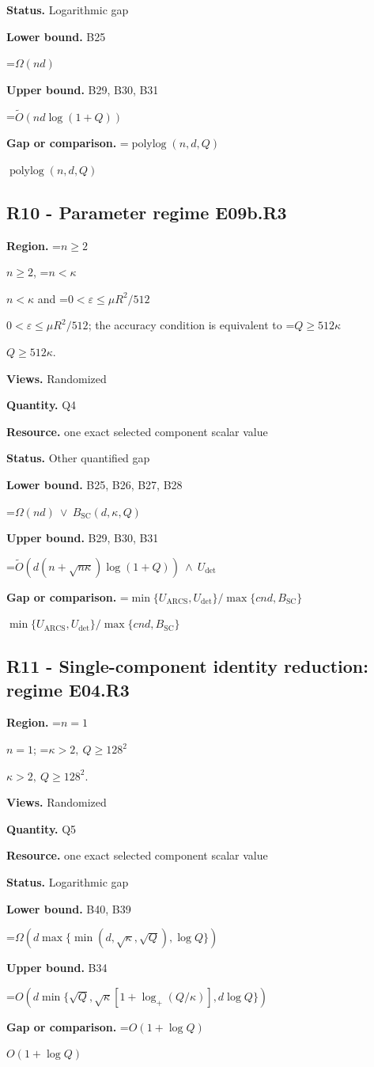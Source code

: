 \documentclass[10pt,a4paper]{article}
\newcommand{\AtlasMath}[1]{\par\begingroup\centering\setbox0=\hbox{$\displaystyle #1$}\ifdim\wd0>1.4\linewidth\typeout{ATLAS WIDE FORMULA: \the\wd0}\fi\ifdim\wd0>\linewidth\resizebox{\linewidth}{!}{\box0}\else\box0\fi\par\endgroup}
\newcommand{\AtlasInlineMath}[1]{\begingroup\setbox0=\hbox{$#1$}\ifdim\wd0>.4\linewidth\endgroup\AtlasMath{#1}\else\endgroup$#1$\fi}
\begin{document}
\textbf{Status.} Logarithmic gap

\textbf{Lower bound.} B25

\AtlasMath{\Omega(nd)}
\textbf{Upper bound.} B29, B30, B31

\AtlasMath{\widetilde{O}(nd\log(1+Q))}
\textbf{Gap or comparison.} \AtlasInlineMath{\operatorname{polylog}(n,d,Q)}

\subsection{R10 - Parameter regime E09b.R3}
\textbf{Region.} \AtlasInlineMath{n\ge2}, \AtlasInlineMath{n<\kappa} and \AtlasInlineMath{0<\varepsilon\le\mu R^2/512}; the accuracy condition is equivalent to \AtlasInlineMath{Q\ge512\kappa}.

\textbf{Views.} Randomized

\textbf{Quantity.} Q4

\textbf{Resource.} one exact selected component scalar value

\textbf{Status.} Other quantified gap

\textbf{Lower bound.} B25, B26, B27, B28

\AtlasMath{\Omega(nd)\ \vee\ B_{\mathrm{SC}}(d,\kappa,Q)}
\textbf{Upper bound.} B29, B30, B31

\AtlasMath{\widetilde{O}(d(n+\sqrt{n\kappa})\log(1+Q))\ \wedge\ U_{\mathrm{det}}}
\textbf{Gap or comparison.} \AtlasInlineMath{\min\{U_{\mathrm{ARCS}},U_{\mathrm{det}}\}/\max\{cnd,B_{\mathrm{SC}}\}}

\subsection{R11 - Single-component identity reduction: regime E04.R3}
\textbf{Region.} \AtlasInlineMath{n=1}; \AtlasInlineMath{\kappa>2,\ Q\ge128^2}.

\textbf{Views.} Randomized

\textbf{Quantity.} Q5

\textbf{Resource.} one exact selected component scalar value

\textbf{Status.} Logarithmic gap

\textbf{Lower bound.} B40, B39

\AtlasMath{\Omega\!\left(d\max\{\min(d,\sqrt\kappa,\sqrt Q),\log Q\}\right)}
\textbf{Upper bound.} B34

\AtlasMath{O(d\min\{\sqrt Q,\sqrt\kappa[1+\log_+(Q/\kappa)],d\log Q\})}
\textbf{Gap or comparison.} \AtlasInlineMath{O(1+\log Q)}
\end{document}
